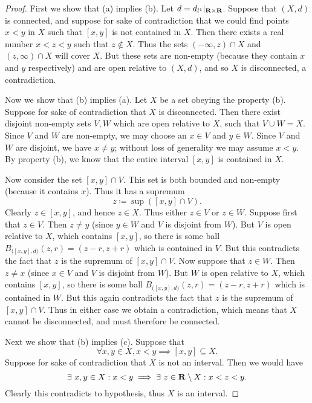 \begin{proof}
    First we show that (a) implies (b).
    Let \(d = d_{l^1}|_{\mathbf{R} \times \mathbf{R}}\).
    Suppose that \((X, d)\) is connected, and suppose for sake of contradiction that we could find points \(x < y\) in \(X\) such that \([x, y]\) is not contained in \(X\).
    Then there exists a real number \(x < z < y\) such that \(z \notin X\).
    Thus the sets \((-\infty, z) \cap X\) and \((z, \infty) \cap X\) will cover \(X\).
    But these sets are non-empty (because they contain \(x\) and \(y\) respectively) and are open relative to \((X, d)\), and so \(X\) is disconnected, a contradiction.

    Now we show that (b) implies (a).
    Let \(X\) be a set obeying the property (b).
    Suppose for sake of contradiction that \(X\) is disconnected.
    Then there exist disjoint non-empty sets \(V , W\) which are open relative to \(X\), such that \(V \cup W = X\).
    Since \(V\) and \(W\) are non-empty, we may choose an \(x \in V\) and \(y \in W\).
    Since \(V\) and \(W\) are disjoint, we have \(x \neq y\);
    without loss of generality we may assume \(x < y\).
    By property (b), we know that the entire interval \([x, y]\) is contained in \(X\).

    Now consider the set \([x, y] \cap V\).
    This set is both bounded and non-empty (because it contains \(x\)).
    Thus it has a supremum
    \[
        z \coloneqq \sup([x, y] \cap V).
    \]
    Clearly \(z \in [x, y]\), and hence \(z \in X\).
    Thus either \(z \in V\) or \(z \in W\).
    Suppose first that \(z \in V\).
    Then \(z \neq y\) (since \(y \in W\) and \(V\) is disjoint from \(W\)).
    But \(V\) is open relative to \(X\), which contains \([x, y]\), so there is some ball \(B_{\big([x,y], d\big)}(z, r) = (z - r, z + r)\) which is contained in \(V\).
    But this contradicts the fact that \(z\) is the supremum of \([x, y] \cap V\).
    Now suppose that \(z \in W\).
    Then \(z \neq x\) (since \(x \in V\) and \(V\) is disjoint from \(W\)).
    But \(W\) is open relative to \(X\), which contains \([x, y]\), so there is some ball \(B_{\big([x,y], d\big)}(z, r) = (z - r, z + r)\) which is contained in \(W\).
    But this again contradicts the fact that \(z\) is the supremum of \([x, y] \cap V\).
    Thus in either case we obtain a contradiction, which means that \(X\) cannot be disconnected, and must therefore be connected.

    Next we show that (b) implies (c).
    Suppose that
    \[
        \forall x, y \in X, x < y \implies [x, y] \subseteq X.
    \]
    Suppose for sake of contradiction that \(X\) is not an interval.
    Then we would have
    \[
        \exists\ x, y \in X : x < y \implies \exists\ z \in \R \setminus X : x < z < y.
    \]
    Clearly this contradicts to hypothesis, thus \(X\) is an interval.


\end{proof}
